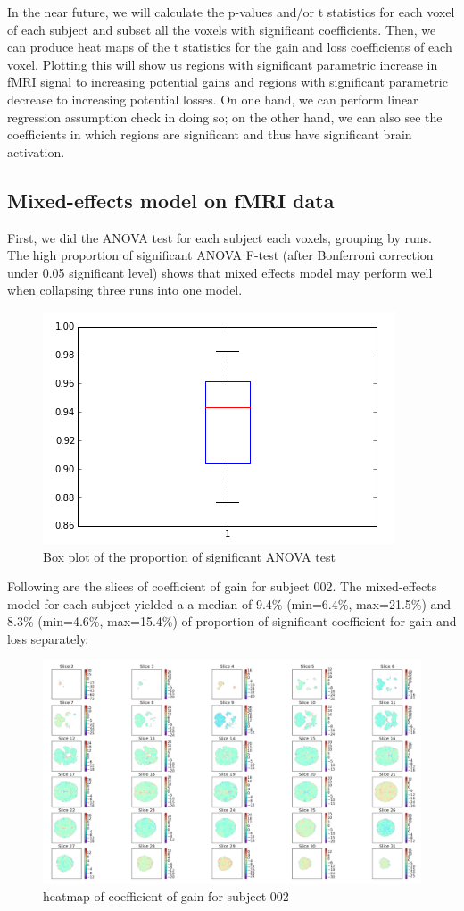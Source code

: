 In the near future, we will calculate the p-values and/or t statistics for 
each voxel of each subject and subset all the voxels with significant 
coefficients. Then, we can produce heat maps of the t statistics for the gain 
and loss coefficients of each voxel. Plotting this will show us regions with 
significant parametric increase in fMRI signal to increasing potential gains 
and regions with significant parametric decrease to increasing potential 
losses. On one hand, we can perform linear regression assumption check in 
doing so; on the other hand, we can also see the coefficients in which regions 
are significant and thus have significant brain activation.


\subsection{Mixed-effects model on fMRI data}
First, we did the ANOVA test for each subject each voxels, grouping by runs. 
The high proportion of significant ANOVA F-test (after  Bonferroni correction 
under 0.05 significant level) shows that mixed effects model may perform well 
when collapsing three runs into one model. 
\begin{figure}[H]
\caption{Box plot of the proportion of significant ANOVA test}
    \centering
        \includegraphics[scale=0.45]{figures/anova_prop.png}
\end{figure}
Following are the slices of coefficient of gain for subject 002. The 
mixed-effects model for each subject yielded a a median of 9.4\% (min=6.4\%, 
max=21.5\%) and 8.3\% (min=4.6\%, max=15.4\%) of proportion of significant 
coefficient for gain and loss separately. 
\begin{figure}[H]
\caption{heatmap of coefficient of gain for subject 002}
    \centering
        \includegraphics[scale=0.35]{figures/sub002_lme_beta_gain.png}
\end{figure}


